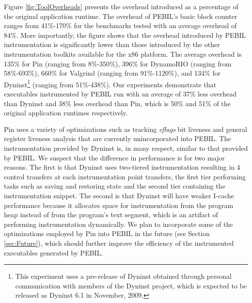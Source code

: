 Figure \ref{fig:ToolOverheads} presents the overhead introduced as a percentage
of the original application runtime. The overhead of PEBIL's basic block counter
ranges from 41\%-170\% for the benchmarks tested with an average overhead of
84\%. More importantly, the figure shows that the overhead introduced by PEBIL
instrumentation is significantly lower than those introduced by the other
instrumentation toolkits available for the x86 platform. The average overhead is
135\% for Pin (ranging from 8\%-350\%), 396\% for DynamoRIO (ranging from
58\%-693\%), 660\% for Valgrind (ranging from 91\%-1120\%), and 134\% for
Dyninst\footnote{This experiment uses a pre-release of Dyninst obtained through
personal communication with members of the Dyninst project, which is expected to
be released as Dyninst 6.1 in November, 2009.} (ranging from 51\%-438\%). Our
experiments demonstrate that executables instrumented by PEBIL run with an
average of 37\% less overhead than Dyninst and 38\% less overhead than Pin,
which is 50\% and 51\% of the original application runtimes respectively.

Pin uses a variety of optimizations such as tracking \textit{eflags} bit
liveness \cite{luk2005pin} and general register liveness analysis that are
currently unincorporated into PEBIL. The instrumentation provided by Dyninst is,
in many respect, similar to that provided by PEBIL. We suspect that the
difference in performance is for two major reasons. The first is that Dyninst
uses two-tiered instrumentation resulting in 4 control transfers at each
instrumentation point transfers, the first tier performing tasks such as saving
and restoring state and the second tier containing the instrumentation snippet.
The second is that Dyninst will have weaker I-cache performance because it
allocates space for instrumentation from the program heap instead of from the
program's text segment, which is an artifact of performing instrumentation
dynamically. We plan to incorporate some of the optimizations employed by Pin
into PEBIL in the future (see Section \ref{sec:Future}), which should further
improve the efficiency of the instrumented executables generated by PEBIL.
